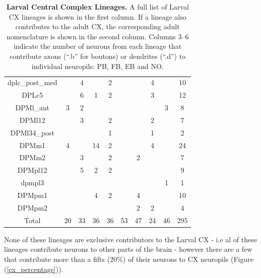 \begin{table}
{\begin{tabular}{|c|c|c|c|c|c|c|c|c|c|}
    dplc\_post\_med &  & 4 &  & 2 &  &  & 4 &  & 10 \\
    DPLc5 &  & 6 & 1 & 2 &  &  & 3 &  & 12 \\
    DPMl\_ant & 3 & 2 &  &  &  &  &  & 3 & 8 \\
    DPMl12 &  & 3 &  & 2 &  &  & 2 &  & 7 \\
    DPMl34\_post &  &  &  & 1 &  &  & 1 &  & 2 \\
    DPMm1 & 4 &  & 14 & 2 &  &  & 4 &  & 24 \\
    DPMm2 &  & 3 &  & 2 &  & 2 &  &  & 7 \\
    DPMpl12 &  & 5 & 2 & 2 &  &  &  &  & 9 \\
    dpmpl3 &  &  &  &  &  &  &  & 1 & 1 \\
    DPMpm1 &  &  & 4 & 2 &  & 4 &  &  & 10 \\
    DPMpm2 &  &  &  &  &  & 2 & 2 &  & 4 \\
    \bottomrule
    Total & 20 & 33 & 36 & 36 & 53 & 47 & 24 & 46 & 295 \\
    \bottomrule
    \end{tabular}
    }
    \caption[Larval Central Complex Lineages]{\textbf{Larval Central Complex Lineages.} A full list of Larval CX lineages is shown in the first column. If a lineage also contributes to the adult CX, the corresponding adult nomenclature \citep{eckstein2024neurotransmitter} is shown in the second column. Columns 3--6 indicate the number of neurons from each lineage that contribute axons (“.b” for boutons) or dendrites (“.d”) to individual neuropils: PB, FB, EB and NO.}
    \label{larvallineages}
    \end{table}

None of these lineages are exclusive contributors to the Larval CX - i.e al of these lineages contribute neurons to other parts of the brain - however there are a few that contribute more than a fifts (20\%) of their neurons to CX neuropils (Figure (\ref{cx_percentage})). %



